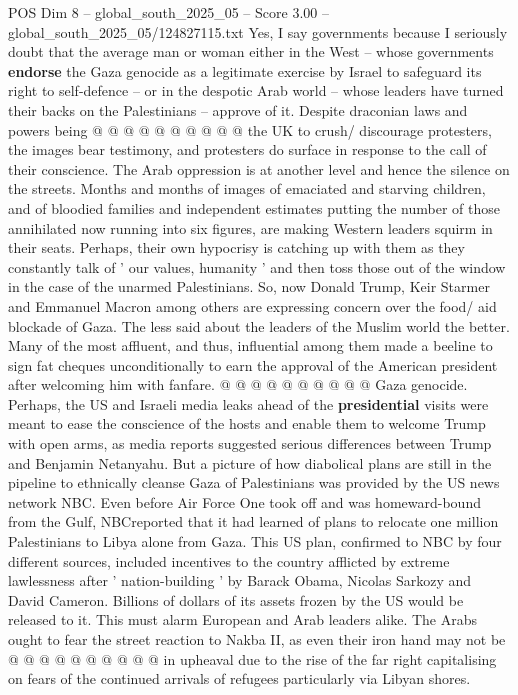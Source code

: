 \begin{textsample}{POS Dim 8 – global\_south\_2025\_05 – Score 3.00 – global\_south\_2025\_05/124827115.txt}
Yes, I say governments because I seriously doubt that the average man or woman either in the West -- whose governments \textbf{endorse} the Gaza genocide as a legitimate exercise by Israel to safeguard its right to self-defence -- or in the despotic Arab world -- whose leaders have turned their backs on the Palestinians -- approve of it.
Despite draconian laws and powers being @ @ @ @ @ @ @ @ @ @ the UK to crush/ discourage protesters, the images bear testimony, and protesters do surface in response to the call of their conscience.
The Arab oppression is at another level and hence the silence on the streets.
Months and months of images of emaciated and starving children, and of bloodied families and independent estimates putting the number of those annihilated now running into six figures, are making Western leaders squirm in their seats.
Perhaps, their own hypocrisy is catching up with them as they constantly talk of ' our values, humanity ' and then toss those out of the window in the case of the unarmed Palestinians.
So, now Donald Trump, Keir Starmer and Emmanuel Macron among others are expressing concern over the food/ aid blockade of Gaza.
The less said about the leaders of the Muslim world the better.
Many of the most affluent, and thus, influential among them made a beeline to sign fat cheques unconditionally to earn the approval of the American president after welcoming him with fanfare. @ @ @ @ @ @ @ @ @ @ Gaza genocide.
Perhaps, the US and Israeli media leaks ahead of the \textbf{presidential} visits were meant to ease the conscience of the hosts and enable them to welcome Trump with open arms, as media reports suggested serious differences between Trump and Benjamin Netanyahu.
But a picture of how diabolical plans are still in the pipeline to ethnically cleanse Gaza of Palestinians was provided by the US news network NBC.
Even before Air Force One took off and was homeward-bound from the Gulf, NBCreported that it had learned of plans to relocate one million Palestinians to Libya alone from Gaza.
This US plan, confirmed to NBC by four different sources, included incentives to the country afflicted by extreme lawlessness after ' nation-building ' by Barack Obama, Nicolas Sarkozy and David Cameron.
Billions of dollars of its assets frozen by the US would be released to it.
This must alarm European and Arab leaders alike.
The Arabs ought to fear the street reaction to Nakba II, as even their iron hand may not be @ @ @ @ @ @ @ @ @ @ in upheaval due to the rise of the far right capitalising on fears of the continued arrivals of refugees particularly via Libyan shores.

\end{textsample}
